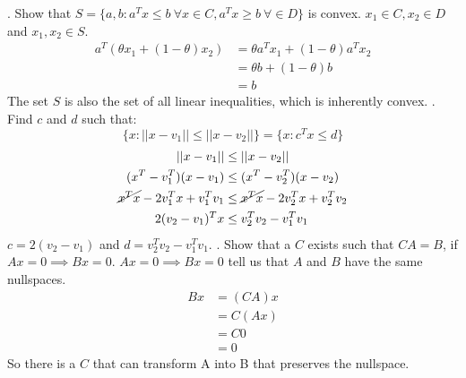 \documentclass{article}
\begin{document}
\newpage
{}. Show that $ S = \{a, b : a^Tx \leq b \ \forall x \in C, a^Tx \geq b \ \forall \in D \}$ is convex. 
$x_1 \in C, x_2 \in D$ and $x_1, x_2 \in S$.
\begin{align*}
	a^T(\theta x_1 + (1-\theta)x_2) &= \theta a^Tx_1 + (1-\theta)a^Tx_2 \\
	&= \theta b + (1-\theta)b \\
	&= b
\end{align*}
The set $S$ is also the set of all linear inequalities, which is inherently convex. 
\newline{}. Find $c$ and $d$ such that:
\begin{equation*}
	\{ x : ||x - v_1|| \leq ||x - v_2|| \} = \{x : c^Tx \leq d\}
\end{equation*}
\begin{align*}
	||x - v_1|| &\leq ||x - v_2|| \\
	(x^T - v_1^T)(x - v_1) &\leq (x^T - v_2^T)(x - v_2) \\
	\cancel{x^Tx} - 2v_1^Tx + v_1^Tv_1 &\leq \cancel{x^Tx} - 2v_2^Tx + v_2^Tv_2 \\
	2(v_2 - v_1)^Tx &\leq v_2^Tv_2 - v_1^Tv_1
\end{align*}
$c = 2(v_2 - v_1)$ and $d = v_2^Tv_2 - v_1^Tv_1 $. 
\newline{}. Show that a $C$ exists such that $CA = B$, if $Ax = 0 \implies Bx = 0$. 
$Ax = 0 \implies Bx = 0$ tell us that $A$ and $B$ have the same nullspaces. 
\begin{align*}
	Bx &= (CA)x \\
	&= C(Ax) \\
	&= C0 \\
	&= 0
\end{align*}
So there is a $C$ that can transform A into B that preserves the nullspace. 
\end{document}

